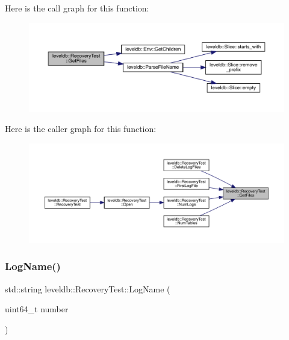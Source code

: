 Here is the call graph for this function\+:
\nopagebreak
\begin{figure}[H]
\begin{center}
\leavevmode
\includegraphics[width=350pt]{classleveldb_1_1_recovery_test_a547c06a2c905b46cbb86a793609c28fd_cgraph}
\end{center}
\end{figure}
Here is the caller graph for this function\+:
\nopagebreak
\begin{figure}[H]
\begin{center}
\leavevmode
\includegraphics[width=350pt]{classleveldb_1_1_recovery_test_a547c06a2c905b46cbb86a793609c28fd_icgraph}
\end{center}
\end{figure}
\mbox{\label{classleveldb_1_1_recovery_test_a1de129c9b097649c0c4349882e536d77}} 
\subsubsection{\texorpdfstring{LogName()}{LogName()}}
{\footnotesize\ttfamily std\+::string leveldb\+::\+Recovery\+Test\+::\+Log\+Name (\begin{DoxyParamCaption}\item[{uint64\+\_\+t}]{number }\end{DoxyParamCaption})\hspace{0.3cm}{\ttfamily [inline]}}

